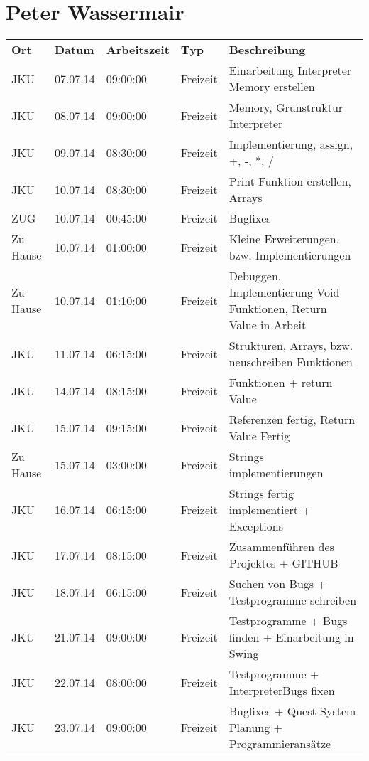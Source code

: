 \ifpeter
\section{Peter Wassermair}

\begin{small}
\begin{longtable}{ p{} p{} p{} p{} p{}}
\textbf{Ort}	& \textbf{Datum}	& \textbf{Arbeitszeit}	& \textbf{Typ}	& \textbf{Beschreibung} \\
JKU	& 07.07.14	& 09:00:00	& Freizeit	& Einarbeitung Interpreter Memory erstellen \\
JKU	& 08.07.14	& 09:00:00	& Freizeit	& Memory, Grunstruktur Interpreter \\
JKU	& 09.07.14	& 08:30:00	& Freizeit	& Implementierung, assign, +, -, *, / \\
JKU	& 10.07.14	& 08:30:00	& Freizeit	& Print Funktion erstellen, Arrays \\
ZUG	& 10.07.14	& 00:45:00	& Freizeit	& Bugfixes \\
Zu Hause	& 10.07.14	& 01:00:00	& Freizeit	& Kleine Erweiterungen, bzw. Implementierungen \\
Zu Hause	& 10.07.14	& 01:10:00	& Freizeit	& Debuggen, Implementierung Void Funktionen, Return Value in Arbeit \\
JKU	& 11.07.14	& 06:15:00	& Freizeit	& Strukturen, Arrays, bzw. neuschreiben Funktionen \\
JKU	& 14.07.14	& 08:15:00	& Freizeit	& Funktionen + return Value \\
JKU	& 15.07.14	& 09:15:00	& Freizeit	& Referenzen fertig, Return Value Fertig \\
Zu Hause	& 15.07.14	& 03:00:00	& Freizeit	& Strings implementierungen \\
JKU	& 16.07.14	& 06:15:00	& Freizeit	& Strings fertig implementiert + Exceptions \\
JKU	& 17.07.14	& 08:15:00	& Freizeit	& Zusammenf\"uhren des Projektes + GITHUB \\
JKU	& 18.07.14	& 06:15:00	& Freizeit	& Suchen von Bugs + Testprogramme schreiben \\
JKU	& 21.07.14	& 09:00:00	& Freizeit	& Testprogramme + Bugs finden + Einarbeitung in Swing \\
JKU	& 22.07.14	& 08:00:00	& Freizeit	& Testprogramme + InterpreterBugs fixen \\
JKU	& 23.07.14	& 09:00:00	& Freizeit	& Bugfixes + Quest System Planung + Programmierans\"atze \\

\end{longtable}
\end{small}

